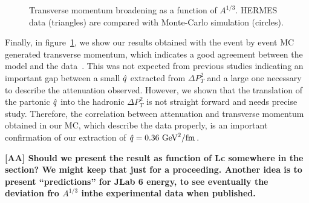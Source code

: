 \begin{figure}[tbp]
  \centering
{}
\caption {Transverse momentum broadening as a function of $A^{1/3}$. HERMES 
data \cite{Airapetian:2009jy} (triangles) are compared with Monte-Carlo 
simulation (circles).}
\label{fig:PtA}
\end{figure}

Finally, in figure~\ref{fig:PtA}, we show our results obtained with the event 
by event MC generated transverse momentum, which indicates a good agreement 
between the model and the data~\cite{Airapetian:2009jy}. This was not expected 
from previous studies indicating an important gap between a small ${\hat q}$ 
extracted from $\Delta P_T^2$ and a large one necessary to describe the 
attenuation observed. However, we shown that the translation of the partonic 
${\hat q}$ into the hadronic $\Delta P_T^2$ is not straight forward and needs 
precise study. Therefore, the correlation between attenuation and transverse 
momentum obtained in our MC, which describe the data properly, is an important 
confirmation of our extraction of ${\hat q} = 0.36\ \text{GeV}^2/ \text{fm}$.

{\bf [AA] Should we present the result as function of Lc somewhere in the section? We might keep that just for a proceeding. Another idea is to present ``predictions'' for JLab 6 energy, to see eventually the deviation fro $A^{1/3}$ inthe experimental data when published.}


